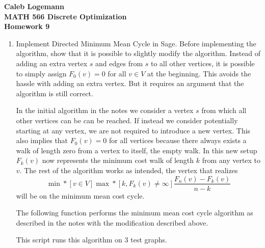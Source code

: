 \documentclass[11pt, oneside]{article}
\begin{document}
\noindent \textbf{\Large{Caleb Logemann \\
MATH 566 Discrete Optimization\\
Homework 9
}}

%
\begin{enumerate}
  \item %
    Implement Directed Minimum Mean Cycle in Sage. 
    Before implementing the algorithm, show that it is possible to slightly
    modify the algorithm.
    Instead of adding an extra vertex $s$ and edges from $s$ to all other
    vertices, it is possible to simply assign $F_0(v) = 0$ for all $v \in V$ at
    the beginning.
    This avoids the hassle with adding an extra vertex.
    But it requires an argument that the algorithm is still correct.

    In the initial algorithm in the notes we consider a vertex $s$ from which
    all other vertices can be can be reached.
    If instead we consider potentially starting at any vertex, we are not
    required to introduce a new vertex.
    This also implies that $F_0(v) = 0$ for all vertices because there always
    exists a walk of length zero from a vertex to itself, the empty walk.
    In this new setup $F_k(v)$ now represents the minimum cost walk of length
    $k$ from any vertex to $v$.
    The rest of the algorithm works as intended, the vertex that realizes
    \[
      \min*[v \in V]{\max*[k, F_k(v) \neq \infty]{\frac{F_n(v) - F_k(v)}{n - k}}}
    \]
    will be on the minimum mean cost cycle.

    The following function performs the minimum mean cost cycle algorithm
    as described in the notes with the modification described above.
    
    This script runs this algorithm on 3 test graphs.
    


\end{enumerate}
\end{document}
